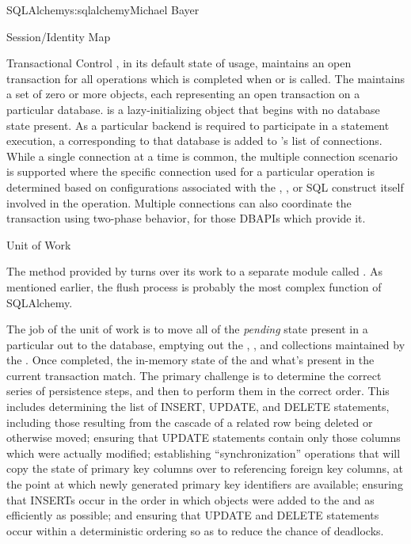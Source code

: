 \begin{aosachapter}{SQLAlchemy}{s:sqlalchemy}{Michael Bayer}
\begin{aosasect1}{Session/Identity Map}
\begin{aosasect2}{Transactional Control}
, in its default state of usage, maintains an
open transaction for all operations which is completed
when  or  is called. The
 maintains a set of zero or more
 objects, each representing an open
transaction on a particular database.
 is a lazy-initializing object that
begins with no database state present. As a particular
backend is required to participate in a statement
execution, a  corresponding to that
database is added to 's list of
connections. While a single connection at a time is
common, the multiple connection scenario is supported
where the specific connection used for a particular
operation is determined based on configurations
associated with the , , or SQL
construct itself involved in the operation. Multiple
connections can also coordinate the transaction using
two-phase behavior, for those DBAPIs which provide it.

\end{aosasect2}

\end{aosasect1}

\begin{aosasect1}{Unit of Work}

The  method provided by  turns over its work
to a separate module called .   As mentioned earlier, the flush process
is probably the most complex function of SQLAlchemy.

The job of the unit of work is to move all of the \emph{pending} state present in a particular
 out to the database, emptying out the , , and 
collections maintained by the .  Once completed, the in-memory state of the
 and what's present in the current transaction match.
The primary challenge is to determine the correct
series of persistence steps, and then to perform them in the correct order.  This includes
determining the list of INSERT, UPDATE, and DELETE statements, including those resulting
from the cascade of a related row being deleted or otherwise moved; ensuring that UPDATE
statements contain only those columns which were actually modified; establishing ``synchronization''
operations that will copy the state of primary key columns over to referencing foreign key
columns, at the point at which newly generated primary key identifiers are available; ensuring
that INSERTs occur in the order in which objects were added to the  and
as efficiently as possible; and ensuring that
UPDATE and DELETE statements occur within a deterministic ordering so as to reduce the chance
of deadlocks.


\end{aosasect1}
\end{aosachapter}
